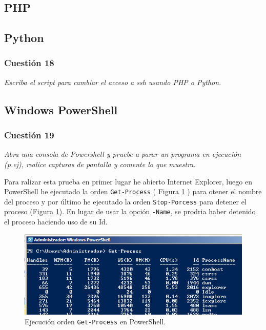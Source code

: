 \subsection{PHP}
\subsection{Python}
\subsubsection{Cuestión 18}
\textit{Escriba el script para cambiar el acceso a ssh usando PHP o Python.}





\subsection{Windows PowerShell}
\subsubsection{Cuestión 19}
\textit{Abra una consola de Powershell y pruebe a parar un programa en ejecución (p.ej), realice capturas de pantalla y comente lo que muestra.}
\newline

Para ralizar esta prueba en primer lugar he abierto Internet Explorer, luego en PowerShell he ejecutado la orden \texttt{Get-Process} \cite{gpps} ( Figura \ref{fig39} ) para otener el nombre del proceso y por último he ejecutado la orden \texttt{Stop-Porcess} \cite{spps} para detener el proceso (Figura \ref{fig39}). En lugar de usar la opción \texttt{-Name}, se prodria haber detenido el proceso haciendo uso de su Id. 

\begin{figure}[H]
    \begin{center}
    \advance\leftskip-1cm
        \includegraphics[scale=0.7]{imagenes/img42}
        \caption{Ejecución orden \texttt{Get-Process} en PowerShell.}
        \label{fig39}
    \end{center}
\end{figure}

